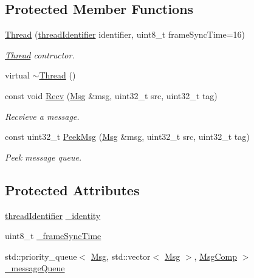 \subsection*{Protected Member Functions}
\begin{DoxyCompactItemize}
\item 
\hyperlink{class_m_p_e_1_1_thread_a6b7b08a261115586ae914a9a2325c299}{Thread} (\hyperlink{namespace_m_p_e_a16447295e3105bd2ba2a9ea303566175}{thread\+Identifier} identifier, uint8\+\_\+t frame\+Sync\+Time=16)
\begin{DoxyCompactList}\small\item\em \hyperlink{class_m_p_e_1_1_thread}{Thread} contructor. \end{DoxyCompactList}\item 
virtual \hyperlink{class_m_p_e_1_1_thread_a5addf4f2209106f58447e2c46087c8d7}{$\sim$\+Thread} ()
\item 
const void \hyperlink{class_m_p_e_1_1_thread_a33de6f9fb89f4ae2adf393e866e198da}{Recv} (\hyperlink{struct_m_p_e_1_1_msg}{Msg} \&msg, uint32\+\_\+t src, uint32\+\_\+t tag)
\begin{DoxyCompactList}\small\item\em Recvieve a message. \end{DoxyCompactList}\item 
const uint32\+\_\+t \hyperlink{class_m_p_e_1_1_thread_afa51801ad970ca768ec5160d7c0d7d42}{Peek\+Msg} (\hyperlink{struct_m_p_e_1_1_msg}{Msg} \&msg, uint32\+\_\+t src, uint32\+\_\+t tag)
\begin{DoxyCompactList}\small\item\em Peek message queue. \end{DoxyCompactList}\end{DoxyCompactItemize}
\subsection*{Protected Attributes}
\begin{DoxyCompactItemize}
\item 
\hyperlink{namespace_m_p_e_a16447295e3105bd2ba2a9ea303566175}{thread\+Identifier} \hyperlink{class_m_p_e_1_1_thread_ab7e98443f40fcf9182ea7bf954b8aaf2}{\+\_\+identity}
\item 
uint8\+\_\+t \hyperlink{class_m_p_e_1_1_thread_ad004c47c4002461c874eae460e18ed2a}{\+\_\+frame\+Sync\+Time}
\item 
std\+::priority\+\_\+queue$<$ \hyperlink{struct_m_p_e_1_1_msg}{Msg}, std\+::vector$<$ \hyperlink{struct_m_p_e_1_1_msg}{Msg} $>$, \hyperlink{struct_m_p_e_1_1_msg_comp}{Msg\+Comp} $>$ \hyperlink{class_m_p_e_1_1_thread_a1484f887be46d595bd49c84eef9911ee}{\+\_\+message\+Queue}
\end{DoxyCompactItemize}
